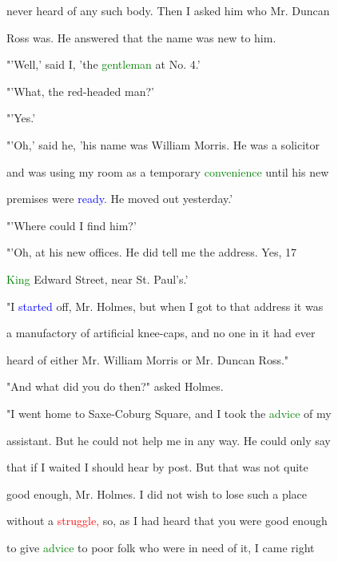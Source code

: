  never heard of any such body. Then I asked him who Mr. Duncan

 Ross was. He answered that the name was new to him.



 "'Well,' said I, 'the \textcolor{green}{gentleman} at No. 4.'



 "'What, the red-headed man?'



 "'Yes.'



 "'Oh,' said he, 'his name was William Morris. He was a solicitor

 and was using my room as a temporary \textcolor{green}{convenience} until his new

 premises were \textcolor{blue}{ready.} He moved out yesterday.'



 "'Where could I find him?'



 "'Oh, at his new offices. He did tell me the address. Yes, 17

 \textcolor{green}{King} Edward Street, near St. Paul's.'



 "I \textcolor{blue}{started} off, Mr. Holmes, but when I got to that address it was

 a manufactory of artificial knee-caps, and no one in it had ever

 heard of either Mr. William Morris or Mr. Duncan Ross."



 "And what did you do then?" asked Holmes.



 "I went home to Saxe-Coburg Square, and I took the \textcolor{green}{advice} of my

 assistant. But he could not help me in any way. He could only say

 that if I \textcolor{BurntOrange}{waited} I should hear by post. But that was not quite

 \textcolor{BurntOrange}{good} enough, Mr. Holmes. I did not wish to \textcolor{BurntOrange}{lose} such a place

 without a \textcolor{red}{struggle,} so, as I had heard that you were \textcolor{BurntOrange}{good} enough

 to give \textcolor{green}{advice} to poor folk who were in need of it, I came right


